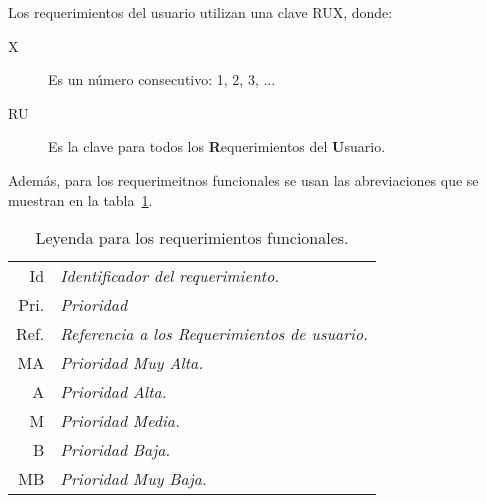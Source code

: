 Los requerimientos del usuario utilizan una clave RUX, donde:

\begin{description}
	\item[X] Es un número consecutivo: 1, 2, 3, ...
	\item[RU] Es la clave para todos los {\textbf{R}}equerimientos del {\textbf{U}}suario.
\end{description}

Además, para los requerimeitnos funcionales se usan las abreviaciones que se muestran en la tabla~\ref{tbl:leyendaRF}.
\begin{table}[hbtp!]
	\begin{center}
		\begin{tabular}{|r l|}
			\hline
			{\footnotesize Id}   & {\footnotesize\em Identificador del requerimiento.}            \\
			{\footnotesize Pri.} & {\footnotesize\em Prioridad}                                   \\
			{\footnotesize Ref.} & {\footnotesize\em Referencia a los Requerimientos de usuario.} \\
			{\footnotesize MA}   & {\footnotesize\em Prioridad Muy Alta.}                         \\
			{\footnotesize A}    & {\footnotesize\em Prioridad Alta.}                             \\
			{\footnotesize M}    & {\footnotesize\em Prioridad Media.}                            \\
			{\footnotesize B}    & {\footnotesize\em Prioridad Baja.}                             \\
			{\footnotesize MB}   & {\footnotesize\em Prioridad Muy Baja.}                         \\
			\hline
		\end{tabular}
		\caption{Leyenda para los requerimientos funcionales.}
		\label{tbl:leyendaRF}
	\end{center}
\end{table}